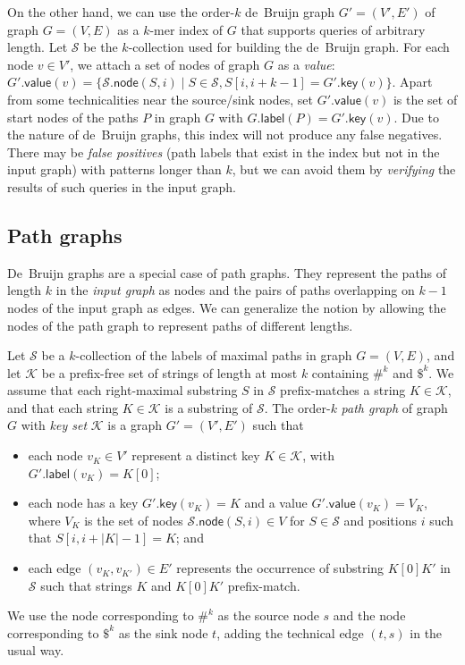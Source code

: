 \documentclass[a4paper,UKenglish]{lipics-v2016}
\newcommand{\set}[1]{\ensuremath{\{ #1 \}}}
\newcommand{\abs}[1]{\ensuremath{\lvert #1 \rvert}}
\newcommand{\glabel}{\ensuremath{\mathsf{label}}}
\newcommand{\gkey}{\ensuremath{\mathsf{key}}}
\newcommand{\gvalue}{\ensuremath{\mathsf{value}}}
\newcommand{\gnode}{\ensuremath{\mathsf{node}}}
\newcommand{\kmer}[1]{$#1$\nobreakdash-mer}
\newcommand{\kcollection}[1]{$#1$\nobreakdash-collection}
\newcommand{\orderk}[1]{order\nobreakdash-$#1$}
\begin{document}
On the other hand, we can use the \orderk{k} de~Bruijn graph $G' = (V', E')$ of graph $G = (V, E)$ as a \kmer{k} index of $G$ that supports queries of arbitrary length. Let $\mathcal{S}$ be the \kcollection{k} used for building the de~Bruijn graph. For each node $v \in V'$, we attach a set of nodes of graph $G$ as a \emph{value}: $G'.\gvalue(v) = \set{ \mathcal{S}.\gnode(S, i) \mid S \in \mathcal{S}, S[i, i+k-1] = G'.\gkey(v)}.$ Apart from some technicalities near the source/sink nodes, set $G'.\gvalue(v)$ is the set of start nodes of the paths $P$ in graph $G$ with $G.\glabel(P) = G'.\gkey(v)$. Due to the nature of de~Bruijn graphs, this index will not produce any false negatives. There may be \emph{false positives} (path labels that exist in the index but not in the input graph) with patterns longer than $k$, but we can avoid them by \emph{verifying} the results of such queries in the input graph.

\subsection{Path graphs}

De~Bruijn graphs are a special case of path graphs. They represent the paths of length $k$ in the \emph{input graph} as nodes and the pairs of paths overlapping on $k-1$ nodes of the input graph as edges. We can generalize the notion by allowing the nodes of the path graph to represent paths of different lengths.

\begin{definition}
Let $\mathcal{S}$ be a \kcollection{k} of the labels of maximal paths in graph $G = (V, E)$, and let $\mathcal{K}$ be a prefix-free set of strings of length at most $k$ containing $\#^{k}$ and $\$^{k}$. We assume that each right-maximal substring $S$ in $\mathcal{S}$ prefix-matches a string $K \in \mathcal{K}$, and that each string $K \in \mathcal{K}$ is a substring of $\mathcal{S}$. The \orderk{k} \emph{path graph} of graph $G$ with \emph{key set} $\mathcal{K}$ is a graph $G' = (V', E')$ such that
\begin{itemize}
\item each node $v_{K} \in V'$ represent a distinct key $K \in \mathcal{K}$, with $G'.\glabel(v_{K}) = K[0]$;
\item each node has a key $G'.\gkey(v_{K}) = K$ and a value $G'.\gvalue(v_{K}) = V_{K}$, where $V_{K}$ is the set of nodes $\mathcal{S}.\gnode(S, i) \in V$ for $S \in \mathcal{S}$ and positions $i$ such that $S[i, i+\abs{K}-1] = K$; and
\item each edge $(v_{K}, v_{K'}) \in E'$ represents the occurrence of substring $K[0] K'$ in $\mathcal{S}$ such that strings $K$ and $K[0] K'$ prefix-match.
\end{itemize}
We use the node corresponding to $\#^{k}$ as the source node $s$ and the node corresponding to $\$^{k}$ as the sink node $t$, adding the technical edge $(t, s)$ in the usual way.
\end{definition}
\end{document}
